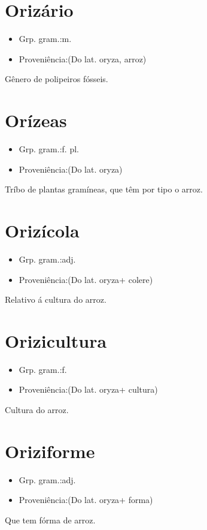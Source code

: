 \section{Orizário}
\begin{itemize}
\item {Grp. gram.:m.}
\end{itemize}
\begin{itemize}
\item {Proveniência:(Do lat. \textunderscore oryza\textunderscore , arroz)}
\end{itemize}
Gênero de polipeiros fósseis.
\section{Orízeas}
\begin{itemize}
\item {Grp. gram.:f. pl.}
\end{itemize}
\begin{itemize}
\item {Proveniência:(Do lat. \textunderscore oryza\textunderscore )}
\end{itemize}
Tríbo de plantas gramíneas, que têm por tipo o arroz.
\section{Orizícola}
\begin{itemize}
\item {Grp. gram.:adj.}
\end{itemize}
\begin{itemize}
\item {Proveniência:(Do lat. \textunderscore oryza\textunderscore  + \textunderscore colere\textunderscore )}
\end{itemize}
Relativo á cultura do arroz.
\section{Orizicultura}
\begin{itemize}
\item {Grp. gram.:f.}
\end{itemize}
\begin{itemize}
\item {Proveniência:(Do lat. \textunderscore oryza\textunderscore  + \textunderscore cultura\textunderscore )}
\end{itemize}
Cultura do arroz.
\section{Oriziforme}
\begin{itemize}
\item {Grp. gram.:adj.}
\end{itemize}
\begin{itemize}
\item {Proveniência:(Do lat. \textunderscore oryza\textunderscore  + \textunderscore forma\textunderscore )}
\end{itemize}
Que tem fórma de arroz.

